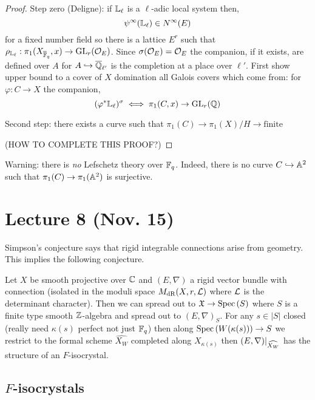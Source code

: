 \documentclass[12pt]{article}
\begin{document}
\begin{proof}
Step zero (Deligne): if $\mathbb{L}_{\ell}$ is a $\ell$-adic local system then,
\[ \psi^{\infty}(\mathbb{L}_{\ell}) \in N^{\infty}(E) \]
for a fixed number field so there is a lattice $E^r$ such that $\rho_{\mathbb{L}_\ell} : \pi_1(X_{\overline{\mathbb{F}}_q}, x) \to \mathrm{GL}_r(\mathcal{O}_{E})$. Since $\sigma(\mathcal{O}_{E}) = \mathcal{O}_{E}$ the companion, if it exists, are defined over $A$ for $A \hookrightarrow \overline{\mathbb{Q}}_{\ell'}$ is the completion at a place over $\ell'$. 
First show upper bound to a cover of $X$ domination all Galois covers which come from: for $\varphi : C \to X$ the companion,
\[ (\varphi^* \mathbb{L}_{\ell})^{\sigma} \iff \pi_1(C, x) \to \mathrm{GL}_r(\mathbb{Q}) \]


Second step: there exists a curve such that $\pi_1(C) \to \pi_1(X) / H \to \text{finite}$

(HOW TO COMPLETE THIS PROOF?)

\end{proof}


\begin{rmk}
Warning: there is \textit{no} Lefschetz theory over $\mathbb{F}_q$. Indeed, there is no curve $C \hookrightarrow \mathbb{A}^2$ such that $\pi_1(C) \to \pi_1(\mathbb{A}^2)$ is surjective.
\end{rmk}

\section{Lecture 8 (Nov. 15)}

\begin{rmk}
Simpson's conjecture says that rigid integrable connections arise from geometry. This implies the following conjecture.
\end{rmk}

\begin{theorem}[E. Groechenig, 2018]
Let $X$ be smooth projective over $\mathbb{C}$ and $(E, \nabla)$ a rigid vector bundle with connection (isolated in the moduli space $M_{\mathrm{dR}}(X, r, \mathcal{L})$ where $\mathcal{L}$ is the determinant character). Then we can spread out to $\mathfrak{X} \to \mathrm{Spec}\left( S \right)$ where $S$ is a finite type smooth $\mathbb{Z}$-algebra and spread out to $(E, \nabla)_S$. For any $s \in |S|$ closed (really need $\kappa(s)$ perfect not just $\mathbb{F}_q$) then along $\mathrm{Spec}\left( W(\kappa(s)) \right) \to S$ we restrict to the formal scheme $\widehat{X_W}$ completed along $X_{\kappa(s)}$ then $(E, \nabla)|_{\widehat{X_W}}$ has the structure of an $F$-isocrystal.
\end{theorem}

\subsection{$F$-isocrystals}
\end{document}
